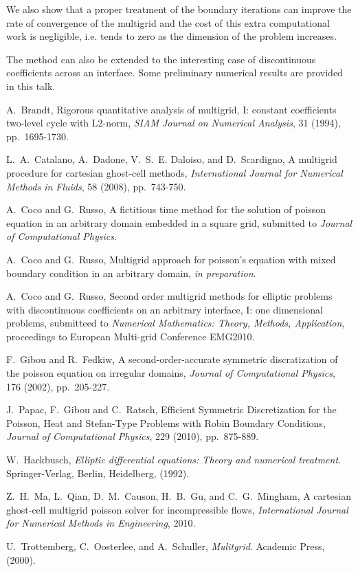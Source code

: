 \documentclass{report}
\begin{document}
We also show that a proper treatment of the boundary iterations can
improve the rate of convergence of the multigrid and the cost of this
extra computational work is negligible, i.e. tends to zero as the
dimension of the problem increases.

The method can also be extended to the interesting case of discontinuous
coefficients across an interface. Some preliminary numerical results are
provided in this talk.

\begin{thebibliography}{100}

A.~Brandt, Rigorous quantitative analysis of multigrid, I: constant
coefficients two-level cycle with L2-norm,
{\em SIAM Journal on Numerical Analysis}, 31 (1994), pp.~1695-1730.

L.~A.~Catalano, A.~Dadone, V.~S.~E. Daloiso, and D.~Scardigno, A
multigrid procedure for cartesian ghost-cell methods,
{\em International Journal for Numerical Methods in Fluids}, 58 (2008), pp.~743-750.

A.~Coco and G.~Russo, A fictitious time method for the solution of
poisson equation in an arbitrary domain embedded in a square grid,
submitted to {\em Journal of Computational Physics}.

A.~Coco and G.~Russo, Multigrid approach for poisson's equation with
mixed boundary condition in an arbitrary domain, {\em in preparation}.

A.~Coco and G.~Russo, Second order multigrid methods for elliptic
problems with discontinuous coefficients on an arbitrary interface, I:
one dimensional problems, submitteed to {\em Numerical Mathematics:
Theory, Methods, Application}, proceedings to European Multi-grid
Conference EMG2010.

F.~Gibou and R.~Fedkiw, A second-order-accurate symmetric discratization
of the poisson equation on irregular domains,
{\em Journal of Computational Physics}, 176 (2002), pp.~205-227.

J.~Papac, F.~Gibou and C.~Ratsch, Efficient Symmetric Discretization for
the Poisson, Heat and Stefan-Type Problems with Robin Boundary
Conditions,
{\em Journal of Computational Physics}, 229 (2010), pp.~875-889.

W.~Hackbusch, {\em Elliptic differential equations: Theory and numerical
treatment}. Springer-Verlag, Berlin, Heidelberg, (1992).

Z.~H.~Ma, L.~Qian, D.~M.~Causon, H.~B.~Gu, and C.~G.~Mingham, A cartesian
ghost-cell multigrid poisson solver for incompressible flows, {\em
International Journal for Numerical Methods in Engineering}, 2010.

U.~Trottemberg, C.~Oosterlee, and A.~Schuller, {\em Mulitgrid}. Academic Press, (2000).


\end{thebibliography}
\end{document}
